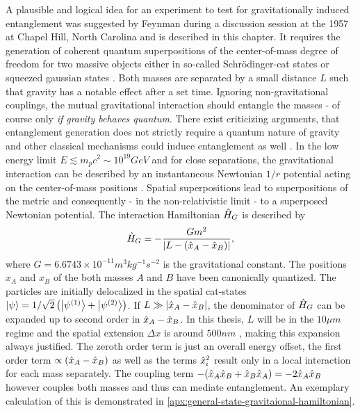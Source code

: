 A plausible and logical idea for an experiment to test for gravitationally induced entanglement was suggested by Feynman during a discussion session at the 1957  at Chapel Hill, North Carolina \cite[p. 247-260]{Rickles_2011} and is described in this chapter.
It requires the generation of coherent quantum superpositions of the center-of-mass degree of freedom for two massive objects either in so-called Schrödinger-cat states or squeezed gaussian states \cite{Bose_2017, Pedernales_2023}.
Both masses are separated by a small distance $L$ such that gravity has a notable effect after a set time.
Ignoring non-gravitational couplings, the mutual gravitational interaction should entangle the masses - of course only \textit{if gravity behaves quantum}.
There exist criticizing arguments, that entanglement generation does not strictly require a quantum nature of gravity and other classical mechanisms could induce entanglement as well \cite{Reginatto_2019}.
In the low energy limit $E\lesssim m_p c^2 \sim 10^{19}\si{GeV}$ and for close separations, the gravitational interaction can be described by an instantaneous Newtonian $1/r$ potential acting on the center-of-mass positions \cite{Carney_2018,Pedernales_2023,Christodoulou_2022}.
Spatial superpositions lead to superpositions of the metric and consequently - in the non-relativistic limit - to a superposed Newtonian potential.
The interaction Hamiltonian $\hat{H}_G$ is described by
\begin{equation}\label{eq:2:gravity-hamiltonian}
  \hat{H}_G = - \frac{Gm^2}{\left\lvert L - (\hat{x}_A - \hat{x}_B)\right\rvert} ,
\end{equation}
where $G=6.6743 \times 10^{-11} \si{m^3 kg^{-1} s^{-2}}$ is the gravitational constant. 
The positions $x_A$ and $x_B$ of the both masses $A$ and $B$ have been canonically quantized. The particles are initially delocalized in the spatial cat-states $\ket{\psi} = 1/\sqrt{2}\left(\ket{\psi^{(1)}} + \ket{\psi^{(2)}}\right)$.
If $L \gg \left\lvert\hat{x}_A - \hat{x}_B\right\rvert$, the denominator of $\hat{H}_G$ can be expanded up to second order in $\hat{x}_A - \hat{x}_B$. In this thesis, $L$ will be in the $10\si{\mu m}$ regime and the spatial extension $\Delta x$ is around $500\si{nm}$ \cite{Fein_2019}, making this expansion always justified.
The zeroth order term is just an overall energy offset, the first order term $\propto (\hat{x}_A - \hat{x}_B)$ as well as the terms $\hat{x}^2_i$ result only in a local interaction for each mass separately. The coupling term $ - (\hat{x}_A\hat{x}_B + \hat{x}_B\hat{x}_A) = -2\hat{x}_A\hat{x}_B$ however couples both masses and thus can mediate entanglement. An exemplary calculation of this is demonstrated in \cref{apx:general-state-gravitaional-hamiltonian}.

